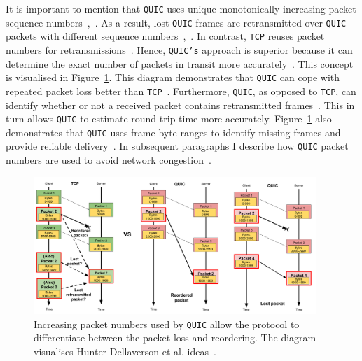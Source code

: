 \documentclass[12pt,a4paper,twoside,openright]{report}
\begin{document}
\begin{itemize}
    
    
    
    It is important to mention that \texttt{QUIC} uses unique monotonically increasing packet sequence numbers~\cite{UnderstandQUIC, The_QUIC_Transport_Protocol_Design_and_Internet-Scale_Deployment},~\cite[Section~4.2]{ietf-quic-recovery-32}.
    As a result, lost \texttt{QUIC} frames are retransmitted over \texttt{QUIC} packets with different sequence numbers~\cite[Section~4]{ietf-quic-recovery-32},~\cite{UnderstandQUIC}.
    In contrast, \texttt{TCP} reuses packet numbers for retransmissions~\cite[Section~4]{ietf-quic-recovery-32}.
    Hence, \texttt{QUIC's} approach is superior because it can determine the exact number of packets in transit more accurately~\cite{UnderstandQUIC}.
    This concept is visualised in Figure~\ref{fig:Impact_of_increasing_pkt_numbers}.
    This diagram demonstrates that \texttt{QUIC} can cope with repeated packet loss better than \texttt{TCP}~\cite{UnderstandQUIC}.
    Furthermore, \texttt{QUIC}, as opposed to \texttt{TCP}, can identify whether or not a received packet contains retransmitted frames~\cite{UnderstandQUIC}.
    This in turn allows \texttt{QUIC} to estimate round-trip time more accurately.
    Figure~\ref{fig:Impact_of_increasing_pkt_numbers} also demonstrates that \texttt{QUIC} uses frame byte ranges to identify missing frames and provide reliable delivery~\cite{UnderstandQUIC}.
    In subsequent paragraphs I describe how \texttt{QUIC} packet numbers are used to avoid network congestion~\cite{UnderstandQUIC}.
    
    \begin{figure}[H]
    \centering
    \includegraphics[width=0.95\textwidth]{figs/Impact_of_increasing_pkt_numbers.png}
    \caption[Increasing packet numbers used by \texttt{QUIC} allow the protocol to differentiate between the packet loss and reordering]{Increasing packet numbers used by \texttt{QUIC} allow the protocol to differentiate between the packet loss and reordering. The diagram visualises Hunter Dellaverson et al. ideas~\cite{UnderstandQUIC}.}
    \label{fig:Impact_of_increasing_pkt_numbers}
    \end{figure}
    

\end{itemize}
\end{document}
